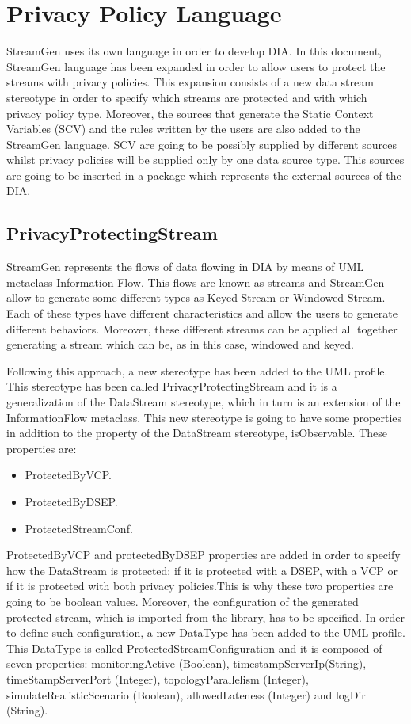 \section{Privacy Policy Language}

StreamGen uses its own language in order to develop DIA. In this document, StreamGen language has been expanded in order to allow users to protect the streams with privacy policies. This expansion consists of a new data stream stereotype in order to specify which streams are protected and with which privacy policy type. Moreover, the sources that generate the Static Context Variables (SCV) and the rules written by the users are also added to the StreamGen language. SCV are going to be possibly supplied by different sources whilst privacy policies will be supplied only by one data source type. This sources are going to be inserted in a package which represents the external sources of the DIA.

\subsection{PrivacyProtectingStream}

StreamGen represents the flows of data flowing in DIA by means of UML metaclass Information Flow. This flows are known as streams and StreamGen allow to generate some different types as Keyed Stream or Windowed Stream. Each of these types have different characteristics and allow the users to generate different behaviors. Moreover, these different streams can be applied all together generating a stream which can be, as in this case, windowed and keyed.

Following this approach, a new stereotype has been added to the UML profile. This stereotype has been called PrivacyProtectingStream and it is a generalization of the DataStream stereotype, which in turn is an extension of the InformationFlow metaclass. This new stereotype is going to have some properties in addition to the property of the DataStream stereotype, isObservable. These properties are:

\begin{itemize}
\item ProtectedByVCP.
\item ProtectedByDSEP.
\item ProtectedStreamConf.
\end{itemize}

ProtectedByVCP and protectedByDSEP properties are added in order to specify how the DataStream is protected; if it is protected with a DSEP, with a VCP or if it is protected with both privacy policies.This is why these two properties are going to be boolean values. Moreover, the configuration of the generated protected stream, which is imported from the library, has to be specified. In order to define such configuration, a new DataType has been added to the UML profile. This DataType is called ProtectedStreamConfiguration and it is composed of seven properties: monitoringActive (Boolean), timestampServerIp(String), timeStampServerPort (Integer), topologyParallelism (Integer), simulateRealisticScenario (Boolean), allowedLateness (Integer) and logDir (String).

